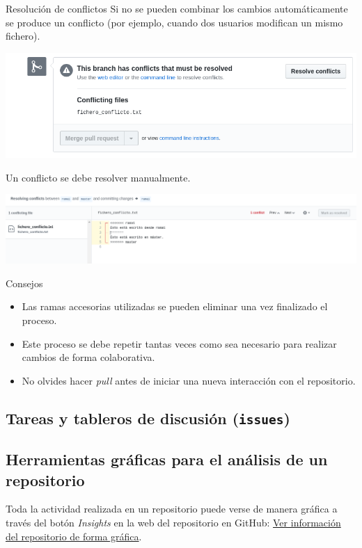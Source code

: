 \documentclass[xcolor={usenames,svgnames,dvipsnames}]{beamer}
\begin{document}
\begin{frame}[label={sec:orgd96b61b}]{Resolución de conflictos}
Si no se pueden combinar los cambios automáticamente se produce un conflicto (por ejemplo, cuando dos usuarios modifican un mismo fichero).

\begin{center}
\includegraphics[width=.9\linewidth]{figs/conflict_web.png}
\end{center}

Un conflicto se debe resolver manualmente.
\begin{center}
\includegraphics[width=.9\linewidth]{figs/resolve_conflict_web.png}
\end{center}
\end{frame}

\begin{frame}[label={sec:org519d491}]{Consejos}
\begin{itemize}
\item Las ramas accesorias utilizadas se pueden eliminar una vez finalizado el proceso.

\item Este proceso se debe repetir tantas veces como sea necesario para realizar cambios de forma colaborativa.

\item \alert{No olvides hacer \emph{pull} antes de iniciar una nueva interacción con el repositorio}.
\end{itemize}
\end{frame}

\subsection{Tareas y tableros de discusión (\texttt{issues})}
\label{sec:orged2e2b0}
\subsection{Herramientas gráficas para el análisis de un repositorio}
\label{sec:org04a42e2}
Toda la actividad realizada en un repositorio puede verse de manera gráfica a través del botón \emph{Insights} en la web del repositorio en GitHub: \href{https://help.github.com/categories/visualizing-repository-data-with-graphs/}{Ver información del repositorio de forma gráfica}. 
\end{document}
